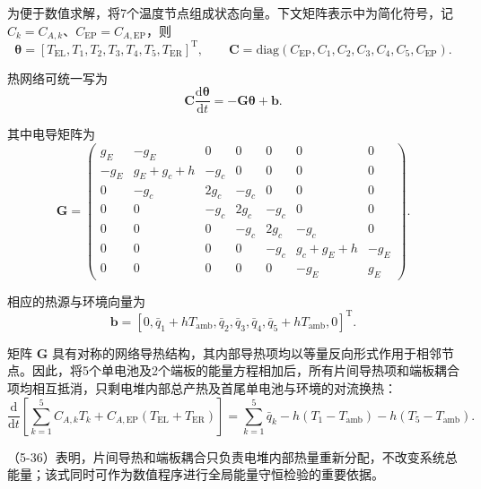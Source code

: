\documentclass[bwprint]{gmcmthesis}
\numberwithin{figure}{section}
\begin{document}
\noindent 为便于数值求解，将7个温度节点组成状态向量。下文矩阵表示中为简化符号，记 \(C_k = C_{A,k}\)、\(C_{\text{EP}} = C_{A,\text{EP}}\)，则
\begin{equation}
\boldsymbol{\theta} = [T_{\text{EL}}, T_1, T_2, T_3, T_4, T_5, T_{\text{ER}}]^{\text{T}}, \qquad \mathbf{C} = \text{diag}(C_{\text{EP}}, C_1, C_2, C_3, C_4, C_5, C_{\text{EP}}). \tag{5-32}
\end{equation}

\noindent 热网络可统一写为
\begin{equation}
\mathbf{C} \frac{\text{d}\boldsymbol{\theta}}{\text{d}t} = -\mathbf{G}\boldsymbol{\theta} + \mathbf{b}. \tag{5-33}
\end{equation}

\noindent 其中电导矩阵为
\begin{equation}
\mathbf{G} = \begin{pmatrix}
g_E & -g_E & 0 & 0 & 0 & 0 & 0 \\
-g_E & g_E + g_c + h & -g_c & 0 & 0 & 0 & 0 \\
0 & -g_c & 2g_c & -g_c & 0 & 0 & 0 \\
0 & 0 & -g_c & 2g_c & -g_c & 0 & 0 \\
0 & 0 & 0 & -g_c & 2g_c & -g_c & 0 \\
0 & 0 & 0 & 0 & -g_c & g_c + g_E + h & -g_E \\
0 & 0 & 0 & 0 & 0 & -g_E & g_E
\end{pmatrix}. \tag{5-34}
\end{equation}

\noindent 相应的热源与环境向量为
\begin{equation}
\mathbf{b} = [0, \bar{q}_1 + hT_{\text{amb}}, \bar{q}_2, \bar{q}_3, \bar{q}_4, \bar{q}_5 + hT_{\text{amb}}, 0]^{\text{T}}. \tag{5-35}
\end{equation}

\noindent 矩阵 \(\mathbf{G}\) 具有对称的网络导热结构，其内部导热项均以等量反向形式作用于相邻节点。因此，将5个单电池及2个端板的能量方程相加后，所有片间导热项和端板耦合项均相互抵消，只剩电堆内部总产热及首尾单电池与环境的对流换热：
\begin{equation}
\frac{\text{d}}{\text{d}t} \left[ \sum_{k=1}^5 C_{A,k}T_k + C_{A,\text{EP}}(T_{\text{EL}} + T_{\text{ER}}) \right] = \sum_{k=1}^5 \bar{q}_k - h(T_1 - T_{\text{amb}}) - h(T_5 - T_{\text{amb}}). \tag{5-36}
\end{equation}

\noindent （5-36）表明，片间导热和端板耦合只负责电堆内部热量重新分配，不改变系统总能量；该式同时可作为数值程序进行全局能量守恒检验的重要依据。
\end{document}
